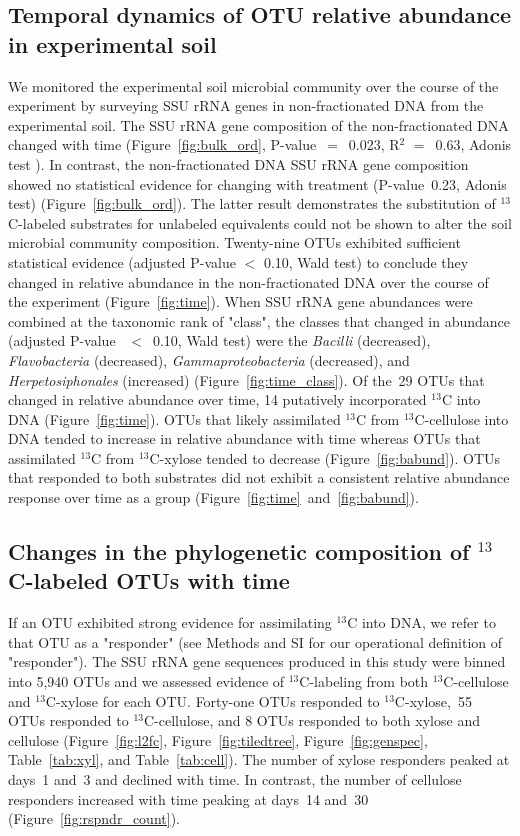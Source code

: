 \subsection{Temporal dynamics of OTU relative abundance in experimental soil}
We monitored the experimental soil microbial community over the course of the
experiment by surveying SSU rRNA genes in non-fractionated DNA from the
experimental soil. The SSU rRNA gene composition of the non-fractionated DNA
changed with time (Figure~\ref{fig:bulk_ord}, P-value~$=$~0.023, R$^{2}$
$=$~0.63, Adonis test \citep{Anderson2001a}). In contrast, the non-fractionated
DNA SSU rRNA gene composition showed no statistical evidence for changing with
treatment (P-value~0.23, Adonis test) (Figure~\ref{fig:bulk_ord}). The latter
result demonstrates the substitution of $^{13}$C-labeled substrates for
unlabeled equivalents could not be shown to alter the soil microbial community
composition. Twenty-nine OTUs exhibited sufficient statistical evidence
(adjusted P-value $<$ 0.10, Wald test) to conclude they changed in relative
abundance in the non-fractionated DNA over the course of the experiment
(Figure~\ref{fig:time}). When SSU rRNA gene abundances were combined at the
taxonomic rank of "class", the classes that changed in abundance (adjusted
P-value~ $<$~0.10, Wald test) were the \textit{Bacilli} (decreased),
\textit{Flavobacteria} (decreased), \textit{Gammaproteobacteria} (decreased),
and \textit{Herpetosiphonales} (increased) (Figure~\ref{fig:time_class}). Of
the~29 OTUs that changed in relative abundance over time, 14 putatively
incorporated $^{13}$C into DNA (Figure~\ref{fig:time}). OTUs that likely
assimilated $^{13}$C from $^{13}$C-cellulose into DNA tended to increase in
relative abundance with time whereas OTUs that assimilated $^{13}$C from
$^{13}$C-xylose tended to decrease (Figure~\ref{fig:babund}). OTUs that
responded to both substrates did not exhibit a consistent relative abundance
response over time as a group (Figure~\ref{fig:time}~and~\ref{fig:babund}).

\subsection{Changes in the phylogenetic composition of $^{13}$C-labeled OTUs with time} \label{responders}
If an OTU exhibited strong evidence for assimilating $^{13}$C into DNA, we
refer to that OTU as a "responder" (see Methods and SI for our operational
definition of "responder"). The SSU rRNA gene sequences produced in this study
were binned into 5,940 OTUs and we assessed evidence of $^{13}$C-labeling from
both $^{13}$C-cellulose and $^{13}$C-xylose for each OTU. Forty-one OTUs
responded to $^{13}$C-xylose,~55 OTUs responded to $^{13}$C-cellulose, and
8 OTUs responded to both xylose and cellulose (Figure~\ref{fig:l2fc},
Figure~\ref{fig:tiledtree}, Figure~\ref{fig:genspec}, Table~\ref{tab:xyl}, and
Table~\ref{tab:cell}). The number of xylose responders peaked at days~1 and~3
and declined with time. In contrast, the number of cellulose responders
increased with time peaking at days~14 and~30 (Figure~\ref{fig:rspndr_count}). 

